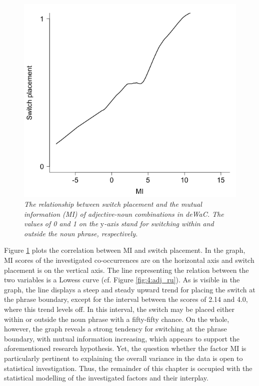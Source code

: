 \begin{figure}
	\centering
    	\includegraphics[scale=0.5]{figures/4-MI_de.png}
	\caption{\textit{The relationship between switch placement and the mutual information (MI) of adjective-noun combinations in deWaC. The values of 0 and 1 on the} y\textit{-axis stand for switching within and outside the noun phrase, respectively.}}
	\label{fig:4:MI_de}
\end{figure}

Figure \ref{fig:4:MI_de} plots the correlation between MI and switch placement. In the graph, MI scores of the investigated co-occurrences are on the horizontal axis and switch placement is on the vertical axis. The line representing the relation between the two variables is a Lowess curve (cf. Figure \ref{fig:4:adj_ru}). As is visible in the graph, the line displays a steep and steady upward trend for placing the switch at the phrase boundary, except for the interval between the scores of 2.14 and 4.0, where this trend levels off. In this interval, the switch may be placed either within or outside the noun phrase with a fifty-fifty chance. On the whole, however, the graph reveals a strong tendency for switching at the phrase boundary, with mutual information increasing, which appears to support the aforementioned research hypothesis. Yet, the question whether the factor MI is particularly pertinent to explaining the overall variance in the data is open to statistical investigation. Thus, the remainder of this chapter is occupied with the statistical modelling of the investigated factors and their interplay.


